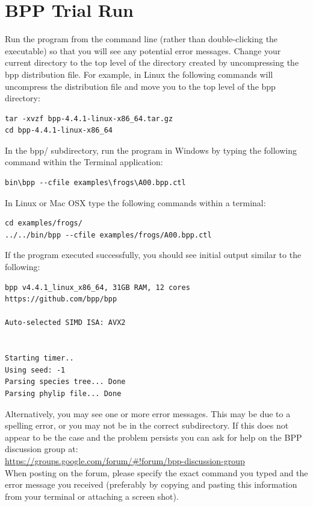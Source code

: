 \documentclass[a4paper]{book}
\numberwithin{equation}{section} \renewcommand{\baselinestretch}{0.55}
\begin{document}
\section{BPP Trial Run}\label{trial}
Run the program from the command line (rather than double-clicking the
executable) so that you will see any potential error messages.  Change
your current directory to the top level of the directory created by
uncompressing the bpp distribution file. For example, in Linux the
following commands will uncompress the distribution file and move you
to the top level of the bpp directory: {\color{red}
\begin{verbatim}
tar -xvzf bpp-4.4.1-linux-x86_64.tar.gz
cd bpp-4.4.1-linux-x86_64
\end{verbatim}
}
\noindent
In the bpp/ subdirectory, run the program in Windows by typing the
following command within the Terminal application: {\color{red}
\begin{verbatim}
bin\bpp --cfile examples\frogs\A00.bpp.ctl
\end{verbatim}}
  \noindent
  In Linux or Mac OSX type the following commands within a terminal:
  {\color{red}
\begin{verbatim}
cd examples/frogs/
../../bin/bpp --cfile examples/frogs/A00.bpp.ctl
\end{verbatim}}  
    \noindent
    If the program executed successfully, you should see initial
    output similar to the following:
{\small
\begin{verbatim}
bpp v4.4.1_linux_x86_64, 31GB RAM, 12 cores
https://github.com/bpp/bpp

Auto-selected SIMD ISA: AVX2


Starting timer..
Using seed: -1
Parsing species tree... Done
Parsing phylip file... Done
\end{verbatim}
}
\noindent
Alternatively, you may see one or more error messages. This may be
due to a spelling error, or you may not be in the correct
subdirectory. If this does not appear to be the case and the
problem persists you can ask for help on the \textsc{BPP}
discussion group at:
\newline \noindent \hspace{0.1pt} \\
\href{https://groups.google.com/forum/#!forum/bpp-discussion-group}{https://groups.google.com/forum/\#!forum/bpp-discussion-group}
\newline \hspace{0.1pt} \\
When posting on the forum, please specify the exact command you
typed and the error message you received (preferably by copying
and pasting this information from your terminal or attaching a screen shot).
\end{document}
